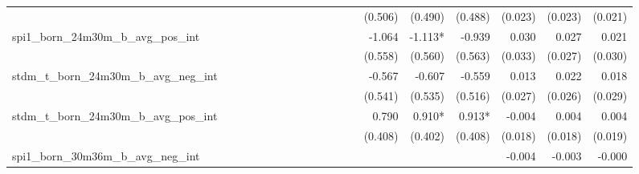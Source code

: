 \begin{tabular}{lrrrrrrrrrrrrrrrrrr}
                                            &              &              &              &              &              &              &              &              &               &              &              &               &      (0.506) &      (0.490) &       (0.488) &      (0.023) &      (0.023) &       (0.021) \\ 
spi1\_born\_24m30m\_b\_avg\_pos\_int        &              &              &              &              &              &              &              &              &               &              &              &               &       -1.064 &      -1.113* &        -0.939 &        0.030 &        0.027 &         0.021 \\ 
                                            &              &              &              &              &              &              &              &              &               &              &              &               &      (0.558) &      (0.560) &       (0.563) &      (0.033) &      (0.027) &       (0.030) \\ 
stdm\_t\_born\_24m30m\_b\_avg\_neg\_int     &              &              &              &              &              &              &              &              &               &              &              &               &       -0.567 &       -0.607 &        -0.559 &        0.013 &        0.022 &         0.018 \\ 
                                            &              &              &              &              &              &              &              &              &               &              &              &               &      (0.541) &      (0.535) &       (0.516) &      (0.027) &      (0.026) &       (0.029) \\ 
stdm\_t\_born\_24m30m\_b\_avg\_pos\_int     &              &              &              &              &              &              &              &              &               &              &              &               &        0.790 &       0.910* &        0.913* &       -0.004 &        0.004 &         0.004 \\ 
                                            &              &              &              &              &              &              &              &              &               &              &              &               &      (0.408) &      (0.402) &       (0.408) &      (0.018) &      (0.018) &       (0.019) \\ 
spi1\_born\_30m36m\_b\_avg\_neg\_int        &              &              &              &              &              &              &              &              &               &              &              &               &              &              &               &       -0.004 &       -0.003 &        -0.000 \\ 

\end{tabular}
